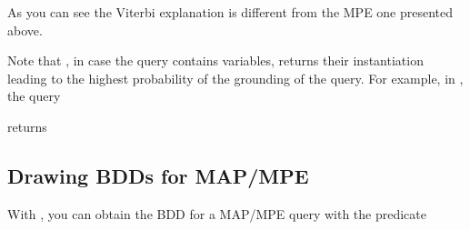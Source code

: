 \documentclass[letterpaper,10pt,english]{sphinxmanual}
\begin{document}
\sphinxAtStartPar
As you can see the Viterbi explanation is different from the MPE one presented above.

\sphinxAtStartPar
Note that , in case the query contains variables, returns their instantiation
leading to the highest probability of the grounding of the query. For example,
in , the query

\begin{sphinxVerbatim}[commandchars=\\\{\}]
\PYG{p}{[}\PYG{p}{]}
\end{sphinxVerbatim}

\sphinxAtStartPar
returns

\begin{sphinxVerbatim}[commandchars=\\\{\}]
  \PYG{p}{[}  \PYG{p}{]}
\end{sphinxVerbatim}


\subsection{Drawing BDDs for MAP/MPE}
\label{\detokenize{index:drawing-bdds-for-map-mpe}}
\sphinxAtStartPar
With , you can obtain the BDD for a MAP/MPE query with the predicate

\begin{sphinxVerbatim}[commandchars=\\\{\}]
          
\end{sphinxVerbatim}
\end{document}
